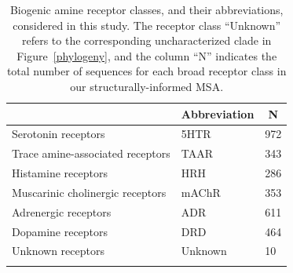 \documentclass[fleqn,10pt]{wlpeerj}
\begin{document}
\vspace*{5cm}


\begin{table}[htbp]
	\centering
	\begin{tabular}{l l l}
		\hline\noalign{\smallskip}
		\multicolumn{1}{c}{Receptor Class} & \multicolumn{1}{c}{Abbreviation} & \multicolumn{1}{c}{N} \\
		\hline\noalign{\smallskip}
		Serotonin receptors & \quad 5HTR & 972  \\
		Trace amine-associated receptors & \quad TAAR & 343 \\
		Histamine receptors & \quad HRH & 286 \\
		Muscarinic cholinergic receptors & \quad mAChR & 353  \\
		Adrenergic receptors & \quad ADR & 611  \\
		Dopamine receptors & \quad DRD & 464 \\
		Unknown receptors & \quad Unknown & 10 \\
		\noalign{\smallskip}\hline\noalign{\smallskip} 
	\end{tabular}
	\caption{\label{tab:abbrev_count} Biogenic amine receptor classes, and their abbreviations, considered in this study. The receptor class ``Unknown'' refers to the corresponding uncharacterized clade in Figure~\ref{phylogeny}, and the column ``N'' indicates the total number of sequences for each broad receptor class in our structurally-informed MSA.}
\end{table}




\newpage
\end{document}
